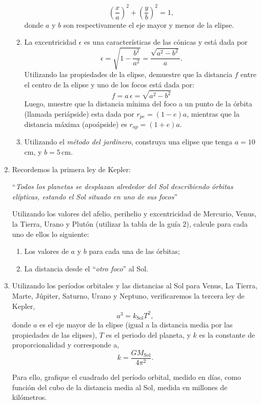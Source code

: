 \documentclass[a4paper,12pt]{article}
\begin{document}
\begin{enumerate}
\begin{enumerate}
        \[\left (\frac xa \right )^2  + \left ( \frac yb \right )^2 = 1, \]
        donde $a$ y $b$ son respectivamente el eje mayor y menor de la elipse.
      \item La excentricidad $\epsilon$ es una características de las cónicas y está dada por \[ \epsilon = \sqrt{1 - \frac{b^2}{a^2}} = \frac{\sqrt{a^2-b^2}}{a}.\] Utilizando las propiedades de la elipse, demuestre que la distancia $f$ entre el centro de la elipse y uno de los focos está dada por:
        \[f=a \, \epsilon = \sqrt{a^2 - b^2}\]
        Luego, muestre que la distancia mínima del foco a un punto de la órbita (llamada periápside) esta dada por $r_{pe} = (1-e) a$, mientras que la distancia máxima (apoápside) es $r_{ap}=(1+e) a$.
      \item Utilizando el {\emph{método del jardinero}}, construya una elipse que tenga $a=10$\,cm, y $b=5$\,cm.
    \end{enumerate}

\item Recordemos la primera ley de Kepler: 

``{\emph{Todos los planetas se desplazan alrededor del Sol describiendo órbitas
elípticas, estando el Sol situado en uno de sus focos}}'' 

Utilizando los valores del afelio, perihelio y excentricidad de Mercurio,
Venus, la Tierra, Urano y Plutón (utilizar la tabla de la guía 2), calcule para cada uno de ellos lo siguiente:

\begin{enumerate}
\item Los valores de $a$ y $b$ para cada una de las órbitas;
\item La distancia desde el ``{\emph{otro foco}}'' al Sol.
\end{enumerate}

\item Utilizando los períodos orbitales y las distancias al Sol para Venus, La Tierra, Marte, Júpiter, Saturno, Urano y Neptuno, verificaremos la tercera ley de Kepler,
  \[
    a^3 = k_{\mathrm{Sol}} T^2,
  \]
  donde $a$ es el eje mayor de la elipse (igual a la distancia media por las propiedades de las elipses), $T$ es el periodo del planeta, y $k$ es la constante de proporcionalidad y corresponde a, 
  \[
    k = \frac{G M_{\mathrm{Sol}}}{4 \pi^2}.
  \]

Para ello, grafique el cuadrado del período orbital, medido en días, como función del cubo de la distancia media al Sol, medida en millones de kilómetros.


\end{enumerate}
\end{document}
